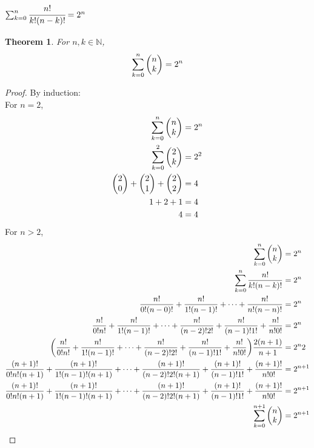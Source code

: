 \documentclass[]{article}
\newcommand{\N}{\mathbb{N}}
\newtheorem{theorem}{Theorem}
\begin{document}
\subsubsection{$\sum_{k=0}^{n} \cfrac{n!}{k!(n-k)!} = 2^n$}
\begin{theorem}
    For $n,k \in \N$,
    $$\sum_{k=0}^{n} \mqty(n\\k) = 2^n$$
\end{theorem}
\begin{proof}
    By induction:\\
    For $n=2$,
    \begin{align*}
        \sum_{k=0}^{n} \mqty(n\\k) &= 2^n\\
        \sum_{k=0}^{2} \mqty(2\\k) &= 2^2\\
        \mqty(2\\0) + \mqty(2\\1) + \mqty(2\\2) &= 4\\
        1 + 2 + 1 &= 4\\
        4 &= 4
    \end{align*}
    For $n >2$,
    \begin{align*}
        \sum_{k=0}^{n} \mqty(n\\k) &= 2^n\\
        \sum_{k=0}^{n} \frac{n!}{k!(n-k)!} &= 2^n\\
        \frac{n!}{0!(n-0)!} + \frac{n!}{1!(n-1)!} + \cdots + \frac{n!}{n!(n-n)!} &= 2^n\\
        \frac{n!}{0!n!} + \frac{n!}{1!(n-1)!} + \cdots + \frac{n!}{(n-2)!2!} 
            + \frac{n!}{(n-1)!1!} + \frac{n!}{n!0!}&=2^n\\
        \qty(\frac{n!}{0!n!} + \frac{n!}{1!(n-1)!} + \cdots + \frac{n!}{(n-2)!2!} 
            + \frac{n!}{(n-1)!1!} + \frac{n!}{n!0!}) \frac{2(n+1)}{n+1}&=2^n2\\
        \frac{(n+1)!}{0!n!(n+1)} + \frac{(n+1)!}{1!(n-1)!(n+1)} + \cdots + \frac{(n+1)!}{(n-2)!2!(n+1)} 
            + \frac{(n+1)!}{(n-1)!1!} + \frac{(n+1)!}{n!0!}&=2^{n+1}\\
        \frac{(n+1)!}{0!n!(n+1)} + \frac{(n+1)!}{1!(n-1)!(n+1)} + \cdots + \frac{(n+1)!}{(n-2)!2!(n+1)} 
            + \frac{(n+1)!}{(n-1)!1!} + \frac{(n+1)!}{n!0!}&=2^{n+1}\\
        \sum_{k=0}^{n+1} \mqty(n\\k) &= 2^{n+1}
    \end{align*}
\end{proof}
\end{document}
